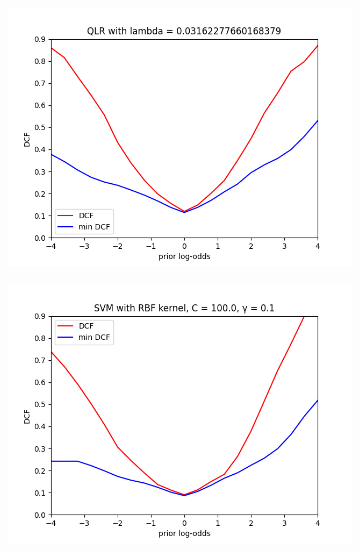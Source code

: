 \begin{figure}[h!]
    \centering
    \begin{subfigure}[b]{0.30\linewidth}
        \includegraphics[width=\linewidth]{Lab/11. Lab 11/Images/BestConfiguration/01. QLR}
        \label{fig:QLRBest}
    \end{subfigure}
    \begin{subfigure}[b]{0.30\linewidth}
        \includegraphics[width=\linewidth]{Lab/11. Lab 11/Images/BestConfiguration/02. SVM}
        \label{fig:SVM}
    \end{subfigure}
    \begin{subfigure}[b]{0.30\linewidth}

\end{subfigure}
\end{figure}
